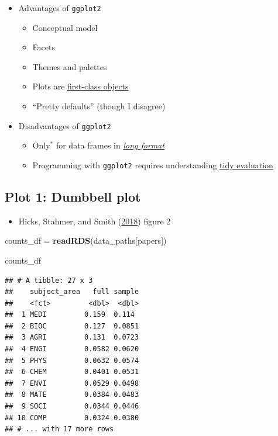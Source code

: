 \documentclass[
]{article}
\newenvironment{Shaded}{\begin{snugshade}}{\end{snugshade}}
\newcommand{\KeywordTok}[1]{\textcolor[rgb]{0.13,0.29,0.53}{\textbf{#1}}}
\newcommand{\NormalTok}[1]{#1}
\newcommand{\StringTok}[1]{\textcolor[rgb]{0.31,0.60,0.02}{#1}}
\providecommand{\tightlist}{%
  \setlength{\itemsep}{0pt}\setlength{\parskip}{0pt}}
\begin{document}
\begin{itemize}
\tightlist
\item
  Advantages of \texttt{ggplot2}

  \begin{itemize}
  \tightlist
  \item
    Conceptual model
  \item
    Facets
  \item
    Themes and palettes
  \item
    Plots are \href{https://en.wikipedia.org/wiki/First-class_citizen}{first-class objects}
  \item
    ``Pretty defaults'' (though I disagree)
  \end{itemize}
\item
  Disadvantages of \texttt{ggplot2}

  \begin{itemize}
  \tightlist
  \item
    Only\(^*\) for data frames in \href{https://cran.r-project.org/web/packages/tidyr/vignettes/tidy-data.html}{\emph{long format}}
  \item
    Programming with \texttt{ggplot2} requires understanding \href{https://www.tidyverse.org/blog/2018/07/ggplot2-tidy-evaluation/}{tidy evaluation}
  \end{itemize}
\end{itemize}

\hypertarget{plot-1-dumbbell-plot}{%
\subsection{Plot 1: Dumbbell plot}\label{plot-1-dumbbell-plot}}

\begin{itemize}
\tightlist
\item
  Hicks, Stahmer, and Smith (\protect\hyperlink{ref-HicksImpactingCapabilitiesConceptual2018}{2018}) figure 2
\end{itemize}

\begin{Shaded}
\begin{Highlighting}[]
\NormalTok{counts\_df =}\StringTok{ }\KeywordTok{readRDS}\NormalTok{(data\_paths[}\StringTok{\textquotesingle{}papers\textquotesingle{}}\NormalTok{])}

\NormalTok{counts\_df}
\end{Highlighting}
\end{Shaded}

\begin{verbatim}
## # A tibble: 27 x 3
##    subject_area   full sample
##    <fct>         <dbl>  <dbl>
##  1 MEDI         0.159  0.114 
##  2 BIOC         0.127  0.0851
##  3 AGRI         0.131  0.0723
##  4 ENGI         0.0582 0.0620
##  5 PHYS         0.0632 0.0574
##  6 CHEM         0.0401 0.0531
##  7 ENVI         0.0529 0.0498
##  8 MATE         0.0384 0.0483
##  9 SOCI         0.0344 0.0446
## 10 COMP         0.0324 0.0380
## # ... with 17 more rows
\end{verbatim}
\end{document}
